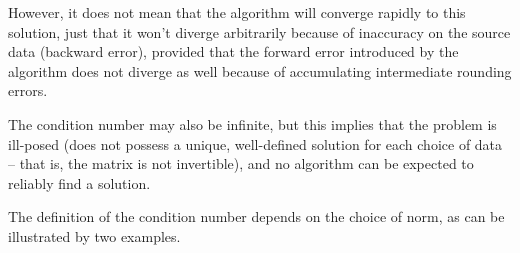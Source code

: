 However, it does not mean that the algorithm will converge rapidly to this
solution, just that it won't diverge arbitrarily because of inaccuracy on the
source data (backward error), provided that the forward error introduced by the
algorithm does not diverge as well because of accumulating intermediate
rounding errors.

The condition number may also be infinite, but this implies that the problem is
ill-posed (does not possess a unique, well-defined solution for each choice of
data -- that is, the matrix is not invertible), and no algorithm can be
expected to reliably find a solution.

The definition of the condition number depends on the choice of norm, as can be
illustrated by two examples.
